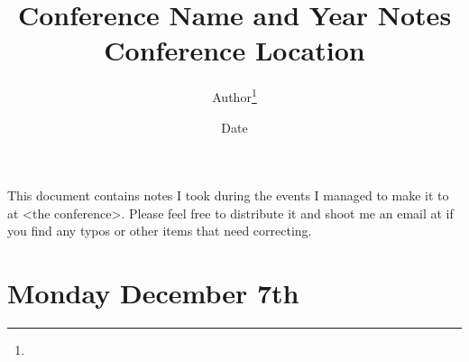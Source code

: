 \documentclass[11pt]{article}
\title{Conference Name and Year Notes \\ \Large{Conference Location}}
\author{Author\footnote{\durl{Author personal page}} \\ \durl{Author email}}
\date{Date}
\begin{document}
\maketitle
\tableofcontents
\newpage


This document contains notes I took during the events I managed to make it to at <the conference>. Please feel free to distribute it and shoot me an email at  if you find any typos or other items that need correcting. \\




\newpage
\section{Monday December 7th}



\newpage


\end{document}

